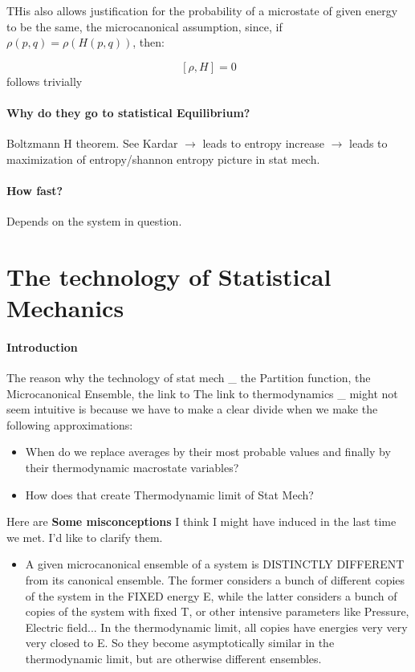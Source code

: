 \documentclass[12pt]{article}
\begin{document}
THis also allows justification for the probability of a microstate of given energy to be the same, the microcanonical assumption, since, if $\rho(p,q)= \rho(H(p,q))$, then:

$$[\rho, H] = 0$$ follows trivially


\paragraph{Why do they go to statistical Equilibrium?}

Boltzmann H theorem.  See Kardar $\rightarrow$ leads to entropy increase $\rightarrow$ leads to maximization of entropy/shannon entropy picture in stat mech.

\paragraph{How fast?}

Depends on the system in question.

\section{The technology of Statistical Mechanics}

\paragraph{Introduction}

The reason why the technology of stat mech \_ the Partition function, the Microcanonical Ensemble, the link to The link to thermodynamics \_ might not seem intuitive is because we have to make a clear divide when we make the following approximations:

\begin{itemize}
\item When do we replace averages by their most probable values and finally by their thermodynamic macrostate variables?
\item  How does that create Thermodynamic limit of Stat Mech?
\end{itemize}
Here are {\bf Some misconceptions}  I think I might have induced in the last time we met.  I'd like to clarify them.

\begin{itemize}
\item A given microcanonical ensemble of a system is DISTINCTLY DIFFERENT from its canonical ensemble.  The former considers a bunch of different copies of the system in the FIXED energy E, while the latter considers a bunch of copies of the system with fixed T, or other intensive parameters like Pressure, Electric field... In the thermodynamic limit, all copies have energies very very very closed to E.  So they become asymptotically similar in the thermodynamic limit, but are otherwise different ensembles.
\end{itemize}
\end{document}
